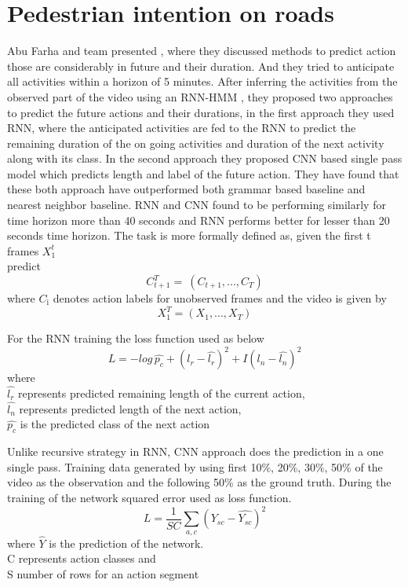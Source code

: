 \section{Pedestrian intention on roads}
\newpara Abu Farha and team presented \cite{abu2018will}, where they discussed methods to predict action those are considerably in future and their duration. And they tried to anticipate all activities within a horizon of 5 minutes. After inferring the activities from the observed part of the video using an RNN-HMM \cite{richard2017weakly}, they proposed two approaches to predict the future actions and their durations, in the first approach they used RNN, where the anticipated activities are fed to the RNN to predict the remaining duration of the on going activities and duration of the next activity along with its class.
In the second approach they proposed CNN based single pass model which predicts length and label of the future action. They have found that these both approach have outperformed both grammar based baseline and nearest neighbor baseline. RNN and CNN found to be performing similarly for time horizon more than 40 seconds and RNN performs better for lesser than 20 seconds time horizon. The task is more formally defined as,
given the first t frames $X_{\text{1}}^t$ \\
predict \[ C_{t+1}^T  = \ (C_{t+1}, ..., C_{T}) \]
where $C_{\text{i}}$ denotes action labels for unobserved frames
and the video is given by
\[ X_{1}^T = (X_{1}, ..., X_{T}) \]

\newpara
For the RNN training the loss function used as below
\begin{equation}
    L = -log\, \hat{p_c} + (l_r - \hat{l_r})^2 +  I (l_n - \hat{l_n})^2 
\end{equation}
where \\
$\hat{l_r}$ represents predicted remaining length of the current action, \\
$\hat{l_n}$ represents predicted length of the next action, \\
$\hat{p_c}$ is the predicted class of the next action

\newpara Unlike recursive strategy in RNN, CNN approach does the prediction in a one single pass.
Training data generated by using first 10\%, 20\%, 30\%, 50\% of the video as the observation and the following 50\% as the ground truth. During the training of the network squared error used as loss function.
\begin{equation}
    L = \frac{1} {SC} \sum_{a,c} (Y_{sc} - \hat{Y_{sc}})^2 
\end{equation}
where $\hat{Y}$ is the prediction of the network. \\
C represents action classes and \\
S number of rows for an action segment

